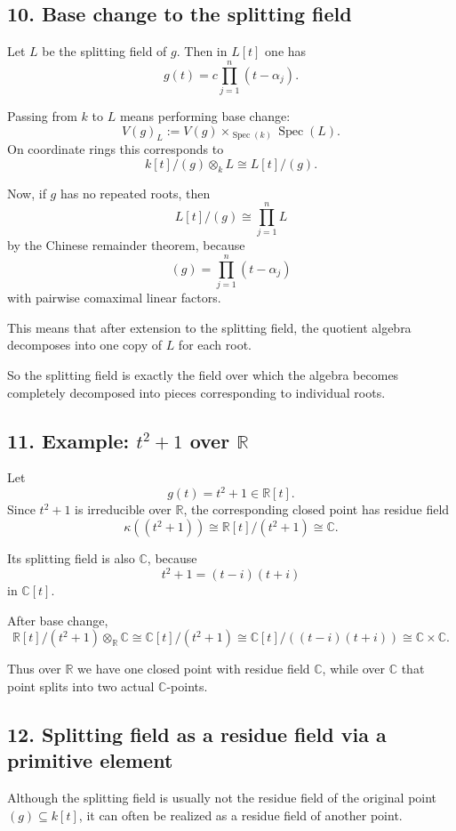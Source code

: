 \documentclass[12pt,a4paper]{article}
\theoremstyle{plain}
\theoremstyle{definition}      %
\begin{document}
\subsection*{10. Base change to the splitting field}

Let \(L\) be the splitting field of \(g\). Then in \(L[t]\) one has
\[
g(t)=c\prod_{j=1}^n (t-\alpha_j).
\]

Passing from \(k\) to \(L\) means performing base change:
\[
V(g)_L:=V(g)\times_{\operatorname{Spec}(k)} \operatorname{Spec}(L).
\]
On coordinate rings this corresponds to
\[
k[t]/(g)\otimes_k L \cong L[t]/(g).
\]

Now, if \(g\) has no repeated roots, then
\[
L[t]/(g)\cong \prod_{j=1}^n L
\]
by the Chinese remainder theorem, because
\[
(g)=\prod_{j=1}^n (t-\alpha_j)
\]
with pairwise comaximal linear factors.

This means that after extension to the splitting field, the quotient algebra decomposes into one copy of \(L\) for each root.

So the splitting field is exactly the field over which the algebra becomes completely decomposed into pieces corresponding to individual roots.

\subsection*{11. Example: \(t^2+1\) over \(\mathbb R\)}

Let
\[
g(t)=t^2+1\in \mathbb R[t].
\]
Since \(t^2+1\) is irreducible over \(\mathbb R\), the corresponding closed point has residue field
\[
\kappa((t^2+1))\cong \mathbb R[t]/(t^2+1)\cong \mathbb C.
\]

Its splitting field is also \(\mathbb C\), because
\[
t^2+1=(t-i)(t+i)
\]
in \(\mathbb C[t]\).

After base change,
\[
\mathbb R[t]/(t^2+1)\otimes_{\mathbb R}\mathbb C
\cong
\mathbb C[t]/(t^2+1)
\cong
\mathbb C[t]/((t-i)(t+i))
\cong
\mathbb C\times \mathbb C.
\]

Thus over \(\mathbb R\) we have one closed point with residue field \(\mathbb C\), while over \(\mathbb C\) that point splits into two actual \(\mathbb C\)-points.

\subsection*{12. Splitting field as a residue field via a primitive element}

Although the splitting field is usually not the residue field of the original point \((g)\subseteq k[t]\), it can often be realized as a residue field of another point.
\end{document}
